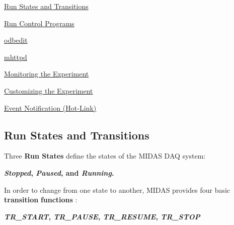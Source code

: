\begin{DoxyItemize}
\item \hyperlink{RC_Run_States_and_Transitions}{Run States and Transitions}
\item \hyperlink{RC_run_control}{Run Control Programs}
\begin{DoxyItemize}
\item \hyperlink{RC_odbedit_utility}{odbedit}
\item \hyperlink{RC_mhttpd}{mhttpd}
\end{DoxyItemize}
\item \hyperlink{RC_Monitor}{Monitoring the Experiment}
\item \hyperlink{RC_customize_ODB}{Customizing the Experiment}
\item \hyperlink{RC_Hot_Link}{Event Notification (Hot-\/Link)}
\end{DoxyItemize}

\par
\par


\label{index_end}
\hypertarget{index_end}{}
  \par
 \subsection{Run States and Transitions}\label{RC_Run_States_and_Transitions}
\par
 

\par
 \label{RC_Run_States_and_Transitions_idx_run_states}
\hypertarget{RC_Run_States_and_Transitions_idx_run_states}{}
 \label{RC_Run_States_and_Transitions_idx_transition}
\hypertarget{RC_Run_States_and_Transitions_idx_transition}{}
 Three {\bfseries Run States} define the states of the MIDAS DAQ system: \par
 \par
\begin{center} {\bfseries {\itshape Stopped\/}, {\itshape Paused\/}, and {\itshape Running\/}.} \end{center}  \par
 In order to change from one state to another, MIDAS provides four basic {\bfseries transition} {\bfseries functions} : \par
 \par
\begin{center}{\bfseries {\itshape TR\_\-START\/}, {\itshape TR\_\-PAUSE\/}, {\itshape TR\_\-RESUME\/}, {\itshape TR\_\-STOP\/} }\end{center} 

